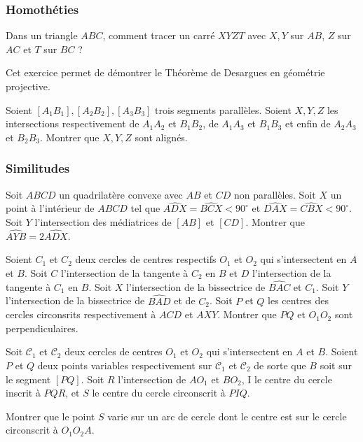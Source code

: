 \subsubsection{Homothéties}


\begin{exo}
Dans un triangle $ABC$, comment tracer un carré $XYZT$ avec $X,Y$ sur $AB$, $Z$ sur $AC$ et $T$ sur $BC$ ?
\end{exo}

Cet exercice permet de démontrer le Théorème de Desargues en géométrie projective.

\begin{exo}
Soient $[A_1B_1],[A_2B_2],[A_3B_3]$ trois segments parallèles. Soient $X,Y,Z$ les intersections respectivement de $A_1A_2$ et $B_1B_2$, de $A_1A_3$ et $B_1B_3$ et enfin de $A_2A_3$ et $B_2B_3$. Montrer que $X,Y,Z$ sont alignés.
\end{exo}

\subsubsection{Similitudes}


\begin{exo}
Soit $ABCD$ un quadrilatère convexe avec $AB$ et $CD$ non parallèles. Soit $X$ un point à l'intérieur de $ABCD$ tel que $\widehat{ADX} = \widehat{BCX} < 90^\circ$ et $\widehat{DAX} = \widehat{CBX} < 90^\circ$. Soit $Y$ l'intersection des médiatrices de $[AB]$ et $[CD]$. Montrer que $\widehat{AYB} = 2\widehat{ADX}$.
\end{exo}


\begin{exo}
Soient $C_1$ et $C_2$ deux cercles de centres respectifs $O_1$ et $O_2$ qui s'intersectent en $A$ et $B$. Soit $C$ l'intersection de la tangente à $C_2$ en $B$ et $D$ l'intersection de la tangente à $C_1$ en $B$. Soit $X$ l'intersection de la bissectrice de $\widehat{BAC}$ et $C_1$. Soit $Y$ l'intersection de la bissectrice de $\widehat{BAD}$ et de $C_2$. Soit $P$ et $Q$ les centres des cercles circonsrits respectivement à $ACD$ et $AXY$. Montrer que $PQ$ et $O_1O_2$ sont perpendiculaires.
\end{exo}


\begin{exo}
Soit $\mathcal{C}_1$ et $\mathcal{C}_2$ deux cercles de centres $O_1$ et $O_2$ qui s'intersectent en $A$ et $B$. Soient $P$ et $Q$ deux points variables respectivement sur $\mathcal{C}_1$ et $\mathcal{C}_2$ de sorte que $B$ soit sur le segment $[PQ]$. Soit $R$ l'intersection de $AO_1$ et $BO_2$, I le centre du cercle inscrit à $PQR$, et $S$ le centre du cercle circonscrit à $PIQ$.

Montrer que le point $S$ varie sur un arc de cercle dont le centre est sur le cercle circonscrit à $O_1O_2A$.
\end{exo}


